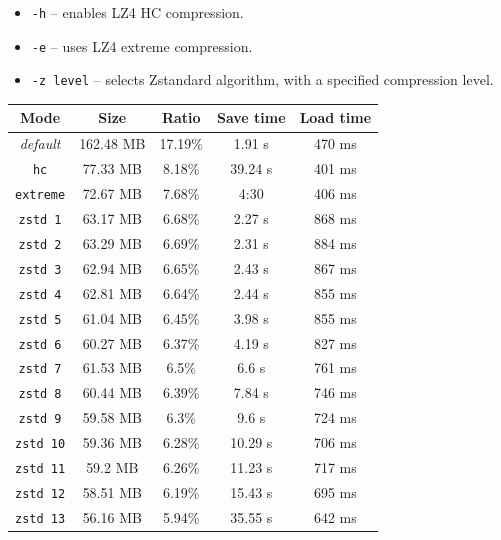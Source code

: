 \documentclass[hidelinks,titlepage,a4paper]{article}
\begin{document}
\begin{itemize}
\item \texttt{-h} -- enables LZ4 HC compression.
\item \texttt{-e} -- uses LZ4 extreme compression.
\item \texttt{-z level} -- selects Zstandard algorithm, with a specified compression level.
\end{itemize}

\begin{table}[h]
\centering
\begin{tabular}[h]{c|c|c|c|c}
\textbf{Mode} & \textbf{Size} & \textbf{Ratio} & \textbf{Save time} & \textbf{Load time} \\ \hline
\emph{default} & 162.48 MB & 17.19\% & 1.91 \si{\second} & 470 \si{\milli\second} \\
\texttt{hc} & 77.33 MB & 8.18\% & 39.24 \si{\second} & 401 \si{\milli\second} \\
\texttt{extreme} & 72.67 MB & 7.68\% & 4:30 & 406 \si{\milli\second} \\ \hline
\texttt{zstd 1} & 63.17 MB & 6.68\% & 2.27 \si{\second} & 868 \si{\milli\second} \\
\texttt{zstd 2} & 63.29 MB & 6.69\% & 2.31 \si{\second} & 884 \si{\milli\second} \\
\texttt{zstd 3} & 62.94 MB & 6.65\% & 2.43 \si{\second} & 867 \si{\milli\second} \\
\texttt{zstd 4} & 62.81 MB & 6.64\% & 2.44 \si{\second} & 855 \si{\milli\second} \\
\texttt{zstd 5} & 61.04 MB & 6.45\% & 3.98 \si{\second} & 855 \si{\milli\second} \\
\texttt{zstd 6} & 60.27 MB & 6.37\% & 4.19 \si{\second} & 827 \si{\milli\second} \\
\texttt{zstd 7} & 61.53 MB & 6.5\% & 6.6 \si{\second} & 761 \si{\milli\second} \\
\texttt{zstd 8} & 60.44 MB & 6.39\% & 7.84 \si{\second} & 746 \si{\milli\second} \\
\texttt{zstd 9} & 59.58 MB & 6.3\% & 9.6 \si{\second} & 724 \si{\milli\second} \\
\texttt{zstd 10} & 59.36 MB & 6.28\% & 10.29 \si{\second} & 706 \si{\milli\second} \\
\texttt{zstd 11} & 59.2 MB & 6.26\% & 11.23 \si{\second} & 717 \si{\milli\second} \\
\texttt{zstd 12} & 58.51 MB & 6.19\% & 15.43 \si{\second} & 695 \si{\milli\second} \\
\texttt{zstd 13} & 56.16 MB & 5.94\% & 35.55 \si{\second} & 642 \si{\milli\second} \\

\end{tabular}
\end{table}
\end{document}

